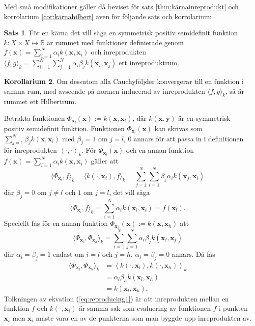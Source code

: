 \documentclass[a4paper, 12pt]{report}
\theoremstyle{definition}
\newtheorem{thm}{Sats}[section]
\newtheorem{cor}[thm]{Korollarium}
\theoremstyle{remark}
\newcommand{\bfx}{\mathbf{x}}
\newcommand{\bfy}{\mathbf{y}}
\newcommand{\llangle}{\left\langle}
\newcommand{\rrangle}{\right\rangle}
\newcommand{\inner}[2]{\llangle #1, #2 \rrangle}
\begin{document}
Med små modifikationer gäller då beviset för sats \ref{thm:kärnainreprodukt} och korrolarium \ref{cor:kärnahilbert} även för följande sats och korrolarium:
\begin{thm}
	För en kärna det vill säga en symmetrisk positiv semidefinit funktion $k: X \times X \longmapsto \mathbb{R}$ är rummet med funktioner definierade genom $f\left(\bfx\right) = \sum_{i=1}^{N}\alpha_ik\left(\bfx, \bfx_i\right)$ och inreprodukten $\langle f,g\rangle_k = \sum_{i=1}^{N}\sum_{j=1}^{N} \alpha_i\beta_jk\left(\bfx_i,\bfx_j\right)$ ett inreproduktrum.
\end{thm}
\begin{cor}
	Om dessutom alla Cauchyföljder konvergerar till en funktion i samma rum, med avseende på normen inducerad av inreprodukten $\langle f, g\rangle_k$, så är rummet ett Hilbertrum.
\end{cor}
Betrakta funktionen $\Phi_{\bfx_l}(\bfx):=k\left(\bfx, \bfx_l\right)$,  där $k\left(\bfx, \bfy\right)$ är en symmetrisk positiv semidefinit funktion.  Funktionen $\Phi_{\bfx_l}(\bfx)$ kan skrivas som $\sum_{j=1}^{N}\beta_jk\left(\bfx, \bfx_l\right)$ med $\beta_j=1$ om $j=l$, 0 annars för att passa in i definitionen för inreprodukten $\inner{\cdot}{\cdot}_k$. För $\Phi_{\bfx_l}(\bfx)$ och en annan funktion $f\left(\bfx\right) = \sum_{i=1}^{N}\alpha_ik\left(\bfx, \bfx_i\right)$ gäller att
	\begin{equation*}
		\langle \Phi_{\bfx_l}, f\rangle_k = \langle k\left(\cdot, \bfx_i\right), f\rangle_k = \sum_{j=1}^{N}\sum_{i=1}^{N}\beta_j\alpha_i k\left(\bfx_j, \bfx_i\right)
	\end{equation*}
	där $\beta_j = 0$ om $j\neq l$ och $1$ om $j=l$, det vill säga
	\begin{equation}\label{eq:reproducing1}
		\langle \Phi_{\bfx_l}, f\rangle_k = \sum_{i=1}^{N}\alpha_i k\left(\bfx_l, \bfx_i\right) = f\left(\bfx_l\right).
	\end{equation}
	Speciellt fås för en annan funktion $\Phi_{\bfx_h}(\bfx):=k\left(\bfx, \bfx_h\right)$ att
	\begin{equation*}
		\langle \Phi_{\bfx_l}, \Phi_{\bfx_h} \rangle_k = \sum_{i=1}^{N}\sum_{j=1}^{N}\alpha_i\beta_jk\left(\bfx_i,\bfx_j\right)
	\end{equation*}
	där $\alpha_i=\beta_j=1$ endast om $i=l$ och $j=h$, $\alpha_i=\beta_j=0$ annars. Då fås
	\begin{equation}\label{eq:reproducing2}
	\begin{aligned}
	\langle \Phi_{\bfx_l}, \Phi_{\bfx_h} \rangle_k &= \inner{k\left(\cdot, \bfx_l\right)}{k\left(\cdot,\bfx_h\right)}_k\\ &= \alpha_l\beta_hk\left(\bfx_l,\bfx_h\right)\\&= k\left(\bfx_l, \bfx_h\right).
	\end{aligned}
	\end{equation}
Tolkningen av ekvation (\ref{eq:reproducing1}) är att inreprodukten mellan en funktion $f$ och $k\left(\cdot, \bfx_i\right)$ är samma sak som evaluering av funktionen $f$ i punkten $\bfx_i$ men $\bfx_i$ måste vara en av de punkterna som man byggde upp inreprodukten av.
\end{document}
